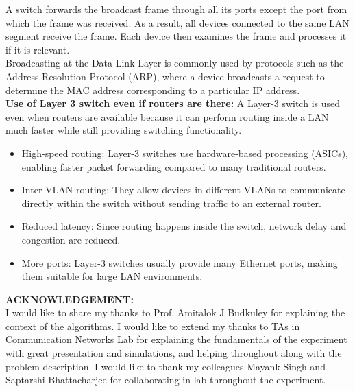\documentclass[a4paper,12pt]{article}
\begin{document}
\noindent
A switch forwards the broadcast frame through all its ports except the port from which the frame was received. As a result, all devices connected to the same LAN segment receive the frame. Each device then examines the frame and processes it if it is relevant.\\

\noindent
Broadcasting at the Data Link Layer is commonly used by protocols such as the Address Resolution Protocol (ARP), where a device broadcasts a request to determine the MAC address corresponding to a particular IP address.\\

\noindent
\textbf{Use of Layer 3 switch even if routers are there: }A Layer-3 switch is used even when routers are available because it can perform routing inside a LAN much faster while still providing switching functionality.

\begin{itemize}
    \item High-speed routing: Layer-3 switches use hardware-based processing (ASICs), enabling faster packet forwarding compared to many traditional routers.
    \item Inter-VLAN routing: They allow devices in different VLANs to communicate directly within the switch without sending traffic to an external router.

    \item Reduced latency: Since routing happens inside the switch, network delay and congestion are reduced.

    \item More ports: Layer-3 switches usually provide many Ethernet ports, making them suitable for large LAN environments.
\end{itemize}




\noindent
\textbf{ACKNOWLEDGEMENT: }\\
I would like to share my thanks to Prof. Amitalok J Budkuley for explaining the context of the algorithms. I would like to extend my thanks to TAs in Communication Networks Lab for explaining the
fundamentals of the experiment with great presentation and simulations,  and helping throughout along with the problem description. I
would like to thank my colleagues Mayank Singh and Saptarshi Bhattacharjee for collaborating in lab throughout the experiment.
\noindent
\printbibliography
\end{document}
